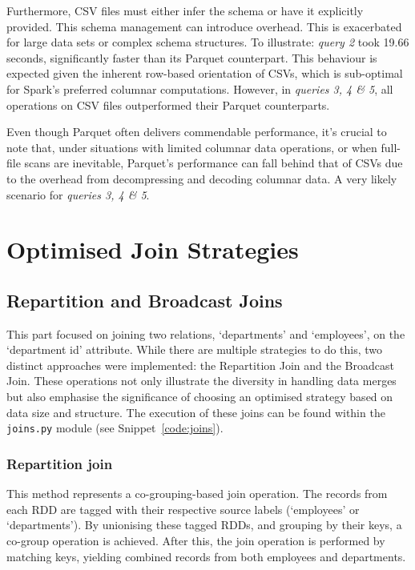 \documentclass[12pt,twoside]{article}
\begin{document}
Furthermore, CSV files must either infer the schema or have it explicitly provided. This schema management can introduce overhead. This is exacerbated for large data sets or complex schema structures. To illustrate: \textit{query 2} took 19.66 seconds, significantly faster than its Parquet counterpart. This behaviour is expected given the inherent row-based orientation of CSVs, which is sub-optimal for Spark's preferred columnar computations. However, in \textit{queries 3, 4 \& 5}, all operations on CSV files outperformed their Parquet counterparts.

Even though Parquet often delivers commendable performance, it's crucial to note that, under situations with limited columnar data operations, or when full-file scans are inevitable, Parquet's performance can fall behind that of CSVs due to the overhead from decompressing and decoding columnar data. A very likely scenario for \textit{queries 3, 4 \& 5}.

\section{Optimised Join Strategies}
\subsection{Repartition and Broadcast Joins}
 This part focused on joining two relations, `departments' and `employees', on the `department id' attribute. While there are multiple strategies to do this, two distinct approaches were implemented: the Repartition Join and the Broadcast Join. These operations not only illustrate the diversity in handling data merges but also emphasise the significance of choosing an optimised strategy based on data size and structure. The execution of these joins can be found within the \texttt{joins.py} module (see Snippet~\ref{code:joins}).

\subsubsection{Repartition join}
This method represents a co-grouping-based join operation. The records from each RDD are tagged with their respective source labels (`employees' or `departments'). By unionising these tagged RDDs, and grouping by their keys, a co-group operation is achieved. After this, the join operation is performed by matching keys, yielding combined records from both employees and departments.

\inputminted[breaklines, breakafter=d, linenos, firstline=11, lastline=39]{python}{./code/joins.py}
\end{document}
